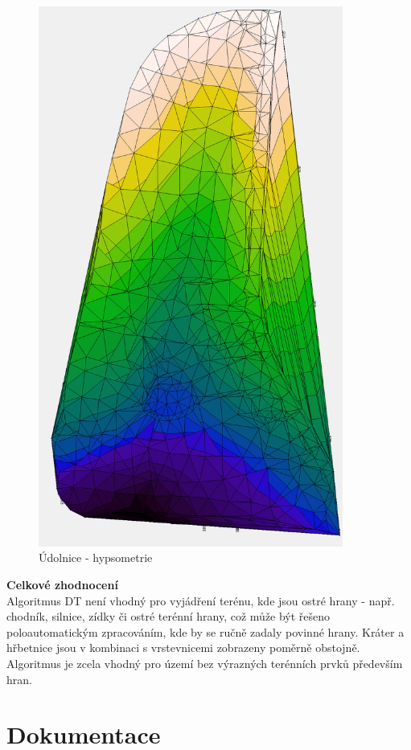 \documentclass[a4paper, 12pt]{article}
\begin{document}
\begin{figure}[h]
	\centering
	\includegraphics[width=10cm]{DMT_hypsometrie.jpg}
	\caption{Údolnice - hypsometrie}
\end{figure}
\clearpage

\textbf{Celkové zhodnocení}\\

Algoritmus DT není vhodný pro vyjádření terénu, kde jsou ostré hrany - např. chodník, silnice, zídky či ostré terénní hrany, což může být řešeno poloautomatickým zpracováním, kde by se ručně zadaly povinné hrany. Kráter a hřbetnice jsou v kombinaci s vrstevnicemi zobrazeny poměrně obstojně. Algoritmus je zcela vhodný pro území bez výrazných terénních prvků především hran.
\clearpage

\section {Dokumentace}
\end{document}
